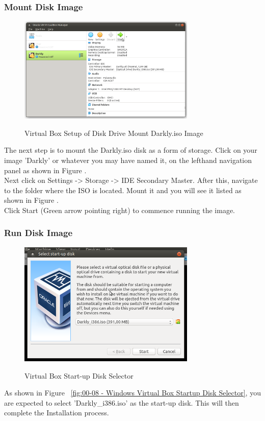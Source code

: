 \subsubsection{Mount Disk Image}
\begin{figure}[!htb]
    \centering
    \includegraphics[width=0.752\textwidth]{images/00-07.png}\\[0cm]  
    \caption[Virtual Box]{Virtual Box Setup of Disk Drive Mount Darkly.iso Image}
    \label{fig:00-07 - Windows Virtual Box ISO Mount} 
\end{figure}
The next step is to mount the Darkly.iso disk as a form of storage. Click on
your image 'Darkly' or whatever you may have named it, on the lefthand navigation
panel as shown in Figure .\\

Next click on Settings -> Storage -> IDE Secondary Master. After this, navigate
to the folder where the ISO is located. Mount it and you will see it listed
as shown in Figure .\\

Click Start (Green arrow pointing right) to commence running the image.

\subsubsection{Run Disk Image}
\begin{figure}[!htb]
    \centering
    \includegraphics[width=0.752\textwidth]{images/00-08.png}\\[0cm]  
    \caption[Virtual Box]{Virtual Box Start-up Disk Selector}
    \label{fig:00-08 - Windows Virtual Box Startup Disk Selector} 
\end{figure}
As shown in Figure ~\vref{fig:00-08 - Windows Virtual Box Startup Disk Selector},
you are expected to select 'Darkly\_i386.iso' as the start-up disk. This will
then complete the Installation process.

